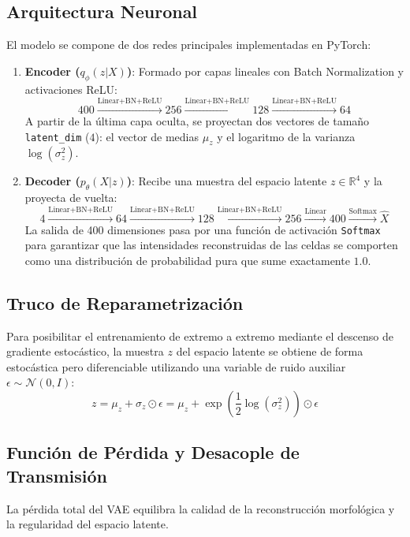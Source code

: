 \documentclass[12pt,letterpaper]{article}
\begin{document}
\subsection{Arquitectura Neuronal}
El modelo se compone de dos redes principales implementadas en PyTorch:
\begin{enumerate}
    \item \textbf{Encoder ($q_\phi(z|X)$)}: Formado por capas lineales con Batch Normalization y activaciones ReLU:
    \begin{equation}
        400 \xrightarrow{\text{Linear+BN+ReLU}} 256 \xrightarrow{\text{Linear+BN+ReLU}} 128 \xrightarrow{\text{Linear+BN+ReLU}} 64
    \end{equation}
    A partir de la última capa oculta, se proyectan dos vectores de tamaño \texttt{latent\_dim} ($4$): el vector de medias $\mu_z$ y el logaritmo de la varianza $\log(\sigma_z^2)$.
    \item \textbf{Decoder ($p_\theta(X|z)$)}: Recibe una muestra del espacio latente $z \in \mathbb{R}^4$ y la proyecta de vuelta:
    \begin{equation}
        4 \xrightarrow{\text{Linear+BN+ReLU}} 64 \xrightarrow{\text{Linear+BN+ReLU}} 128 \xrightarrow{\text{Linear+BN+ReLU}} 256 \xrightarrow{\text{Linear}} 400 \xrightarrow{\text{Softmax}} \hat{X}
    \end{equation}
    La salida de 400 dimensiones pasa por una función de activación \texttt{Softmax} para garantizar que las intensidades reconstruidas de las celdas se comporten como una distribución de probabilidad pura que sume exactamente $1.0$.
\end{enumerate}

\subsection{Truco de Reparametrización}
Para posibilitar el entrenamiento de extremo a extremo mediante el descenso de gradiente estocástico, la muestra $z$ del espacio latente se obtiene de forma estocástica pero diferenciable utilizando una variable de ruido auxiliar $\epsilon \sim \mathcal{N}(0, I)$:
\begin{equation}
    z = \mu_z + \sigma_z \odot \epsilon = \mu_z + \exp\left(\frac{1}{2}\log(\sigma_z^2)\right) \odot \epsilon
\end{equation}

\subsection{Función de Pérdida y Desacople de Transmisión}
La pérdida total del VAE equilibra la calidad de la reconstrucción morfológica y la regularidad del espacio latente. 
\end{document}
